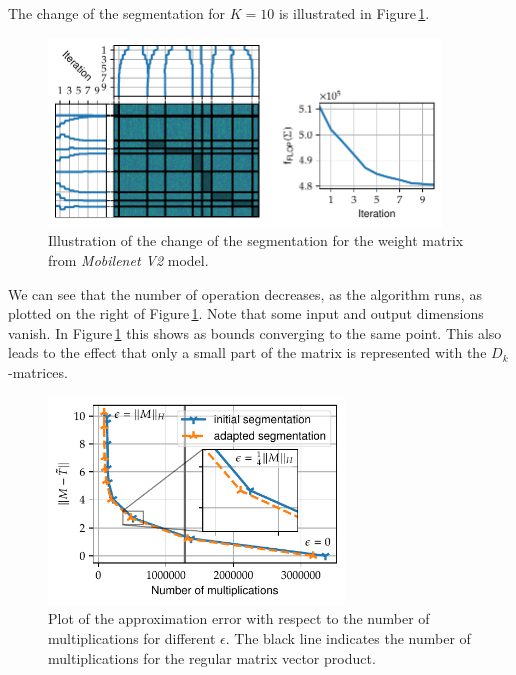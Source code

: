 \documentclass[doctype=mastersthesis,BCOR=15mm,biblatex]{ldvbook}%
\begin{document}
The change of the segmentation for $K=10$ is illustrated in Figure\,\ref{fig:mobilenet_seperation_comp}.
\begin{figure}[!htb]
	\centering
	\includegraphics[width=0.93\textwidth]{Plots/move_example_mobilenet_comp.pdf}
	\caption{Illustration of the change of the segmentation for the weight matrix from \emph{Mobilenet V2} model.
	}
	\label{fig:mobilenet_seperation_comp}
\end{figure}
We can see that the number of operation decreases, as the algorithm runs, as plotted on the right of Figure\,\ref{fig:mobilenet_seperation_comp}.
Note that some input and output dimensions vanish. 
In Figure\,\ref{fig:mobilenet_seperation_comp} this shows as bounds converging to the same point. This also leads to the effect that only a small part of the matrix is represented with the $D_k$-matrices.
\begin{figure}[!htb]
	\centering
	\includegraphics[width=0.7\textwidth]{Plots/move_example_mobilenet_error.pdf}
	\caption{Plot of the approximation error with respect to the number of multiplications for different $\epsilon$. 
		The black line indicates the number of multiplications for the regular matrix vector product. 
	}
	\label{fig:mobilenet_err_cost}
\end{figure}
\end{document}
